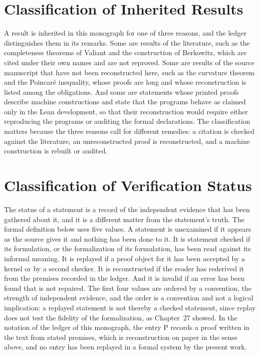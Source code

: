\documentclass[11pt,letterpaper]{report}
\theoremstyle{plain}
\theoremstyle{definition}
\theoremstyle{remark}
\begin{document}
\section{Classification of Inherited Results}

A result is inherited in this monograph for one of three reasons, and the ledger distinguishes them in its remarks. Some are results of the literature, such as the completeness theorems of Valiant and the construction of Berkowitz, which are cited under their own names and are not reproved. Some are results of the source manuscript that have not been reconstructed here, such as the curvature theorem and the Poincar\'e inequality, whose proofs are long and whose reconstruction is listed among the obligations. And some are statements whose printed proofs describe machine constructions and state that the programs behave as claimed only in the Lean development, so that their reconstruction would require either reproducing the programs or auditing the formal declarations. The classification matters because the three reasons call for different remedies: a citation is checked against the literature, an unreconstructed proof is reconstructed, and a machine construction is rebuilt or audited.

\section{Classification of Verification Status}

The status of a statement is a record of the independent evidence that has been gathered about it, and it is a different matter from the statement's truth. The formal definition below uses five values. A statement is unexamined if it appears as the source gives it and nothing has been done to it. It is statement checked if its formulation, or the formalization of its formulation, has been read against its informal meaning. It is replayed if a proof object for it has been accepted by a kernel or by a second checker. It is reconstructed if the reader has rederived it from the premises recorded in the ledger. And it is invalid if an error has been found that is not repaired. The first four values are ordered by a convention, the strength of independent evidence, and the order is a convention and not a logical implication: a replayed statement is not thereby a checked statement, since replay does not test the fidelity of the formalization, as Chapter~27 showed. In the notation of the ledger of this monograph, the entry P records a proof written in the text from stated premises, which is reconstruction on paper in the sense above, and no entry has been replayed in a formal system by the present work.
\end{document}
